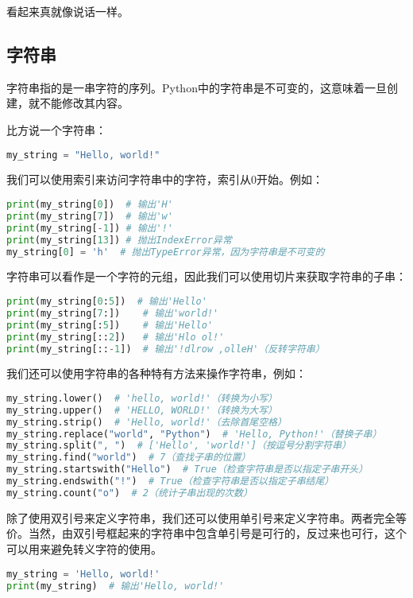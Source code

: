 看起来真就像说话一样。

\subsection{字符串}

字符串指的是一串字符的序列。Python中的字符串是不可变的，这意味着一旦创建，就不能修改其内容。

比方说一个字符串：
\begin{lstlisting}[language=python]
my_string = "Hello, world!"
\end{lstlisting}
我们可以使用索引来访问字符串中的字符，索引从0开始。例如：
\begin{lstlisting}[language=python]
print(my_string[0])  # 输出'H'
print(my_string[7])  # 输出'w'
print(my_string[-1]) # 输出'!'
print(my_string[13]) # 抛出IndexError异常
my_string[0] = 'h'  # 抛出TypeError异常，因为字符串是不可变的
\end{lstlisting}

字符串可以看作是一个字符的元组，因此我们可以使用切片来获取字符串的子串：
\begin{lstlisting}[language=python]
print(my_string[0:5])  # 输出'Hello'
print(my_string[7:])    # 输出'world!'
print(my_string[:5])    # 输出'Hello'
print(my_string[::2])   # 输出'Hlo ol!'
print(my_string[::-1])  # 输出'!dlrow ,olleH'（反转字符串）
\end{lstlisting}

我们还可以使用字符串的各种特有方法来操作字符串，例如：
\begin{lstlisting}[language=python]
my_string.lower()  # 'hello, world!'（转换为小写）
my_string.upper()  # 'HELLO, WORLD!'（转换为大写）
my_string.strip()  # 'Hello, world!'（去除首尾空格）
my_string.replace("world", "Python")  # 'Hello, Python!'（替换子串）
my_string.split(", ")  # ['Hello', 'world!']（按逗号分割字符串）
my_string.find("world")  # 7（查找子串的位置）
my_string.startswith("Hello")  # True（检查字符串是否以指定子串开头）
my_string.endswith("!")  # True（检查字符串是否以指定子串结尾）
my_string.count("o")  # 2（统计子串出现的次数）
\end{lstlisting}

除了使用双引号来定义字符串，我们还可以使用单引号来定义字符串。两者完全等价。当然，由双引号框起来的字符串中包含单引号是可行的，反过来也可行，这个可以用来避免转义字符的使用。

\begin{lstlisting}[language=python]
my_string = 'Hello, world!'
print(my_string)  # 输出'Hello, world!'
\end{lstlisting}

